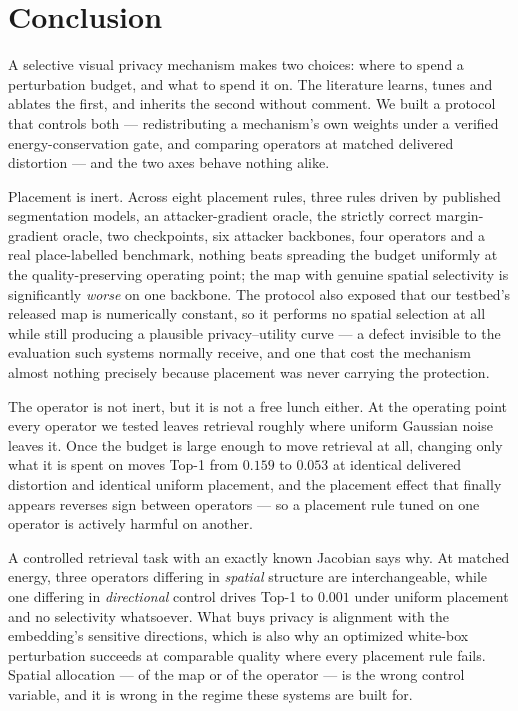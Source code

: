 \documentclass[10pt,journal]{IEEEtran}
\begin{document}
\section{Conclusion}
A selective visual privacy mechanism makes two choices: where to spend a
perturbation budget, and what to spend it on. The literature learns, tunes and
ablates the first, and inherits the second without comment. We built a
protocol that controls both --- redistributing a mechanism's own weights under
a verified energy-conservation gate, and comparing operators at matched
delivered distortion --- and the two axes behave nothing alike.

Placement is inert. Across eight placement rules, three rules driven by
published segmentation models, an attacker-gradient oracle, the strictly
correct margin-gradient oracle, two checkpoints, six attacker backbones, four
operators and a real place-labelled benchmark, nothing beats spreading the
budget uniformly at the quality-preserving operating point; the map with
genuine spatial selectivity is significantly \emph{worse} on one backbone. The
protocol also exposed that our testbed's released map is numerically constant,
so it performs no spatial selection at all while still producing a plausible
privacy--utility curve --- a defect invisible to the evaluation such systems
normally receive, and one that cost the mechanism almost nothing precisely
because placement was never carrying the protection.

The operator is not inert, but it is not a free lunch either. At the operating
point every operator we tested leaves retrieval roughly where uniform Gaussian
noise leaves it. Once the budget is large enough to move retrieval at all,
changing only what it is spent on moves Top-1 from $0.159$ to $0.053$ at
identical delivered distortion and identical uniform placement, and the
placement effect that finally appears reverses sign between operators --- so a
placement rule tuned on one operator is actively harmful on another.

A controlled retrieval task with an exactly known Jacobian says why. At
matched energy, three operators differing in \emph{spatial} structure are
interchangeable, while one differing in \emph{directional} control drives
Top-1 to $0.001$ under uniform placement and no selectivity whatsoever. What
buys privacy is alignment with the embedding's sensitive directions, which is
also why an optimized white-box perturbation succeeds at comparable quality
where every placement rule fails. Spatial allocation --- of the map or of the
operator --- is the wrong control variable, and it is wrong in the regime
these systems are built for.
\end{document}
